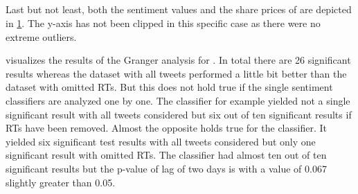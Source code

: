 \subsection{\vw}
\label{ss:analysis-granger-vw}

Last but not least, both the sentiment values and the share prices of \vw{} are depicted in \cref{fig:analysis-results-vw}.
The y-axis has not been clipped in this specific case as there were no extreme outliers.

\begin{figure}[hbt]
    \centering
    
    \caption{\resultsCaption{\vw}}
    \label{fig:analysis-results-vw}
\end{figure} 


 visualizes the results of the Granger analysis for \vw{}.
In total there are 26 significant results whereas the dataset with all tweets performed a little bit better than the dataset with omitted \acp{RT}.
But this does not hold true if the single sentiment classifiers are analyzed one by one.
The classifier \tb{} for example yielded not a single significant result with all tweets considered but six out of ten significant results if \acp{RT} have been removed.
Almost the opposite holds true for the \nb{} classifier.
It yielded six significant test results with all tweets considered but only one significant result with omitted \acp{RT}.
The \svm{} classifier had almost ten out of ten significant results but the p-value of lag of two days is with a value of 0.067 slightly greater than 0.05.

